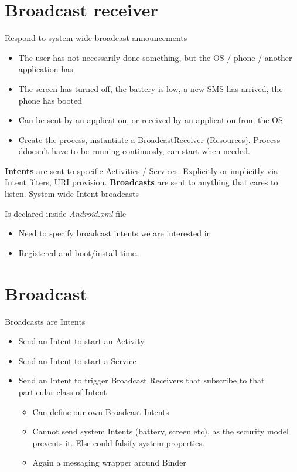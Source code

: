 \documentclass{article}
\begin{document}
\tableofcontents

\newpage

\section{Broadcast receiver}

\begin{flushleft}
Respond to system-wide broadcast announcements
\begin{itemize}
  \item The user has not necessarily done something, but the OS / phone / another application has 
  \item The screen has turned off, the battery is low, a new SMS has arrived, the phone has booted 
  \item Can be sent by an application, or received by an application from the OS 
  \item Create the process, instantiate a BroadcastReceiver (Resources). Process ddoesn't have to be running continuosly, can start when needed.
\end{itemize}
\textbf{Intents} are sent to specific Activities / Services. Explicitly or implicitly via Intent filters, URI provision. \textbf{Broadcasts} are sent to anything that cares to listen. System-wide Intent broadcasts
  \item Is declared inside \textit{Android.xml} file
  \begin{itemize}
    \item Need to specify broadcast intents we are interested in
    \item Registered and boot/install time.
  \end{itemize}
\end{flushleft}

\section{Broadcast}

\begin{flushleft}
Broadcasts are Intents
\begin{itemize}
  \item  Send an Intent to start an Activity 
  \item Send an Intent to start a Service 
  \item Send an Intent to trigger Broadcast Receivers that subscribe to that particular class of Intent 
  \begin{itemize}
    \item Can define our own Broadcast Intents 
    \item Cannot send system Intents (battery, screen etc), as the security model prevents it. Else could falsify system properties. 
    \item Again a messaging wrapper around Binder
  \end{itemize}
\end{itemize}
\end{flushleft}
\end{document}
